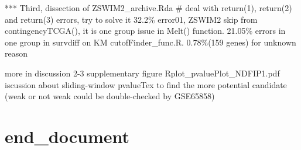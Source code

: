 \documentclass[preprint,12pt]{elsarticle}
\newenvironment{MyColorPar}[1]{%
    \leavevmode\color{#1}\ignorespaces%
}{%
}%
\begin{document}
\begin{MyColorPar}{blue}
\begin{MyColorPar}{red}
***
Third, dissection of ZSWIM2\_archive.Rda %
# deal with return(1), return(2) and return(3) errors, try to solve it
32.2\% error01, ZSWIM2 skip from contingencyTCGA(), it is one group issue in Melt() function.
21.05\% errors in  one group in survdiff on KM cutofFinder_func.R.
0.78\%(159 genes) for unknown reason

more in discussion
2-3 supplementary figure Rplot_pvaluePlot_NDFIP1.pdf
iscussion about sliding-window pvalueTex to find the more potential candidate (weak or not weak could be double-checked by GSE65858)


\end{MyColorPar} %


\end{MyColorPar} %







%



\section{end_document}
\end{document}
